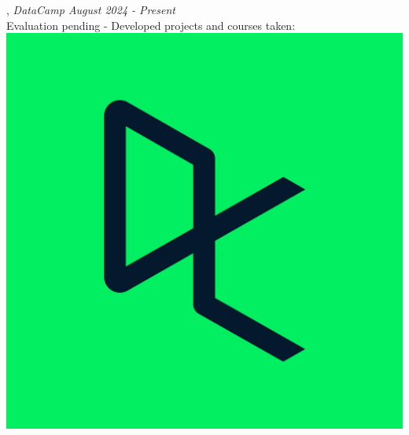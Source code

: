 , \textit{DataCamp \hfill	August 2024 - Present}
\\ \hspace{0.3 cm}  Evaluation pending - Developed projects and courses taken:\hspace{0.1 cm} \href{https://www.datacamp.com/portfolio/juanjogervasio}{\includegraphics[scale=0.008]{datacamp.jpg}}
